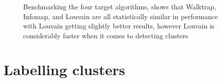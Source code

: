 \begin{figure}[ht]
\centering
{}


\caption[Cluster Family Load Profiles]{ Benchmarking the four target algorithms, shows that Walktrap, Infomap, and Louvain are all statistically similar in performance with Louvain getting slightly better results, however Louvain is considerably faster when it comes to detecting clusters}
\label{fig:ChooseAlg}
\end{figure}

\section{Labelling clusters}
\label{sec:labelClust}

